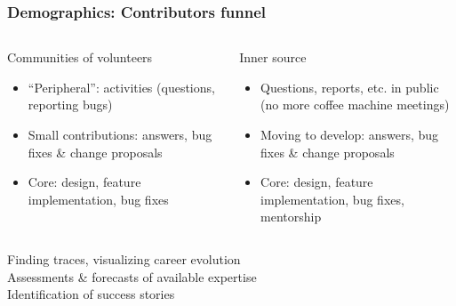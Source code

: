 \documentclass[17pt,aspectratio=169,hyperref=pdfusetitle]{beamer}
\begin{document}

\begin{frame}
\frametitle{Demographics: Contributors funnel}

\begin{columns}[T]
\begin{column}{.49\textwidth}

Communities of volunteers

\begin{itemize}
\item ``Peripheral'': activities (questions, reporting bugs)
\item Small contributions: answers, bug fixes \& change proposals
\item Core: design, feature implementation, bug fixes
\end{itemize}

\end{column}%
\hfill%
\begin{column}{.49\textwidth}

  Inner source

\begin{itemize}
\item Questions, reports, etc. in public \\
  (no more coffee machine meetings)
\item Moving to develop: answers, bug fixes \& change proposals
\item Core: design, feature implementation, bug fixes, mentorship
\end{itemize}

\end{column}%
\end{columns}


\begin{center}
  {\Large
  Finding traces, visualizing career evolution \\

  Assessments \& forecasts of available expertise \\

  Identification of success stories \\
  }
\end{center}
\end{frame}

\end{document}
